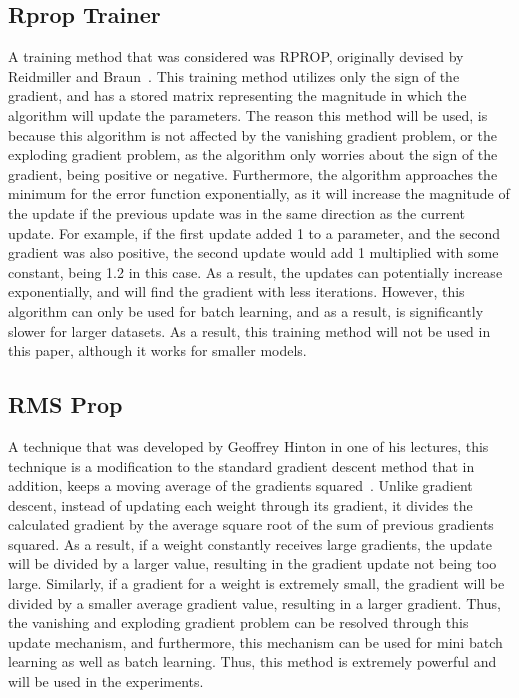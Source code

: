 \documentclass{article}
\begin{document}
\subsection{Rprop Trainer}
A training method that was considered was RPROP, originally devised by
Reidmiller and Braun~\cite{rprop}. This training method utilizes only the sign
of the gradient, and has a stored matrix representing the magnitude in which the
algorithm will update the parameters. The reason this method will be used, is
because this algorithm is not affected by the vanishing gradient problem, or the
exploding gradient problem, as the algorithm only worries about the sign of the
gradient, being positive or negative. Furthermore, the algorithm approaches the
minimum for the error function exponentially, as it will increase the magnitude
of the update if the previous update was in the same direction as the current
update. For example, if the first update added 1 to a parameter, and the second
gradient was also positive, the second update would add 1 multiplied with some
constant, being 1.2 in this case. As a result, the updates can potentially
increase exponentially, and will find the gradient with less iterations.
However, this algorithm can only be used for batch learning, and as a result, is
significantly slower for larger datasets. As a result, this training method will
not be used in this paper, although it works for smaller models.

\subsection{RMS Prop}
A technique that was developed by Geoffrey Hinton in one of his lectures, this
technique is a modification to the standard gradient descent method that in
addition, keeps a moving average of the gradients squared~\cite{rmsprop}. Unlike
gradient descent, instead of updating each weight through its gradient, it
divides the calculated gradient by the average square root of the sum of
previous gradients squared. As a result, if a weight constantly receives large
gradients, the update will be divided by a larger value, resulting in the
gradient update not being too large. Similarly, if a gradient for a weight is
extremely small, the gradient will be divided by a smaller average gradient
value, resulting in a larger gradient. Thus, the vanishing and exploding
gradient problem can be resolved through this update mechanism, and furthermore,
this mechanism can be used for mini batch learning as well as batch learning.
Thus, this method is extremely powerful and will be used in the experiments.
\end{document}
